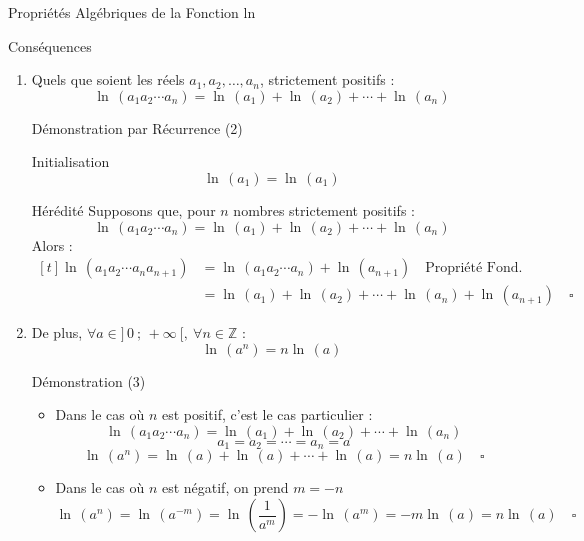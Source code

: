 \documentclass{coursbook}
\begin{document}
\begin{Gpartie}{Propriétés Algébriques de la Fonction ln}
\begin{Spartie}{Conséquences}
\begin{enumerate}[(1)]
\begin{SSpartie}{Démonstration (1)}
                    La deuxième égalité est le cas particulier où $a=1$.$\quad\square$
                \end{SSpartie}
                \item Quels que soient les réels $a_1, a_2,\dotsc, a_n$, strictement positifs : 
                \[\boxed{\ln\,(a_1a_2\dotsb a_n)=\ln\,(a_1)+\ln\,(a_2)+\dotsb+\ln\,(a_n)}\]
                \pagebreak
                \begin{SSpartie}{Démonstration par Récurrence (2)}
                    \begin{SSSpartie}{Initialisation}
                        \[\ln\,(a_1)=\ln\,(a_1)\]
                    \end{SSSpartie}
                    \begin{SSSpartie}{Hérédité}
                        Supposons que, pour $n$ nombres strictement positifs :
                        \[\ln\,(a_1a_2\dotsb a_n)=\ln\,(a_1)+\ln\,(a_2)+\dotsb+\ln\,(a_n)\]
                        Alors :
                        \[\begin{aligned}[t]
                            \ln\,(a_1a_2\dotsb a_na_{n+1})&=\ln\,(a_1a_2\dotsb a_n)+\ln\,(a_{n+1})\quad\text{Propriété Fond.} \\
                            &=\ln\,(a_1)+\ln\,(a_2)+\dotsb+\ln\,(a_n)+\ln\,(a_{n+1})\quad\square
                        \end{aligned}\]
                    \end{SSSpartie}
                \end{SSpartie}
                \item De plus, $\forall a\in\big]\,0~;\,+\infty~\big[,~\forall n\in\mathbb{Z}$ :
                \[\boxed{\ln\,\left(a^n\right)=n\ln\,(a)}\]
                \begin{SSpartie}{Démonstration (3)}
                    \begin{itemize}
                        \item Dans le cas où $n$ est positif, c'est le cas particulier :
                        \[\ln\,(a_1a_2\dotsb a_n)=\ln\,(a_1)+\ln\,(a_2)+\dotsb+\ln\,(a_n)\]
                        \[a_1=a_2=\dotsb=a_n=a\]
                        \[\ln\,(a^n)=\ln\,(a)+\ln\,(a)+\dotsb+\ln\,(a)=n\ln\,(a)\quad\square\]
                        \item Dans le cas où $n$ est négatif, on prend $m=-n$
                        \[\ln\,(a^n)=\ln\,(a^{-m})=\ln\,\left(\frac{1}{a^m}\right)=-\ln\,(a^m)=-m\ln\,(a)=n\ln\,(a)\quad\square\]
                    \end{itemize}

\end{SSpartie}
\end{enumerate}
\end{Spartie}
\end{Gpartie}
\end{document}
